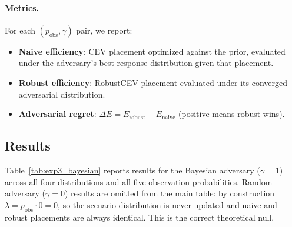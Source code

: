 \documentclass[11pt]{article}
\begin{document}
\paragraph{Metrics.}
For each $(p_\mathrm{obs}, \gamma)$ pair, we report:
\begin{itemize}
    \item \textbf{Naive efficiency}: CEV placement optimized against the
          prior, evaluated under the adversary's best-response distribution
          given that placement.
    \item \textbf{Robust efficiency}: RobustCEV placement evaluated under
          its converged adversarial distribution.
    \item \textbf{Adversarial regret}: $\Delta E = E_\mathrm{robust} -
          E_\mathrm{naive}$ (positive means robust wins).
\end{itemize}

\subsection{Results}
\label{sec:exp3:results}

Table~\ref{tab:exp3_bayesian} reports results for the Bayesian adversary
($\gamma = 1$) across all four distributions and all five observation
probabilities.  Random adversary ($\gamma = 0$) results are omitted from
the main table: by construction $\lambda = p_\mathrm{obs} \cdot 0 = 0$,
so the scenario distribution is never updated and naive and robust
placements are always identical.  This is the correct theoretical null.
\end{document}
